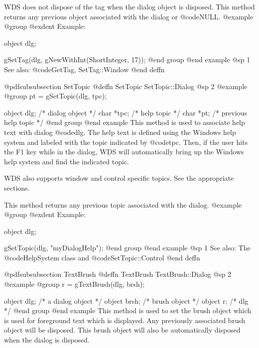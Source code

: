 WDS does not dispose of the tag when the dialog object is disposed.
This method returns any previous object associated with the dialog or
@code{NULL}.
@example
@group
@exdent Example:

object  dlg;

gSetTag(dlg, gNewWithInt(ShortInteger, 17));
@end group
@end example
@sp 1
See also:  @code{GetTag, SetTag::Window}
@end deffn











@pdfsubsubsection {SetTopic}
@deffn {SetTopic} SetTopic::Dialog
@sp 2
@example
@group
pt = gSetTopic(dlg, tpc);

object  dlg;    /*  dialog object         */
char    *tpc;   /*  help topic            */
char    *pt;    /*  previous help topic   */
@end group
@end example
This method is used to associate help text with dialog @code{dlg}.
The help text is defined using the Windows help system and labeled
with the topic indicated by @code{tpc}.  Then, if the user hits
the F1 key while in the dialog, WDS will automatically bring up
the Windows help system and find the indicated topic.

WDS also supports window and control specific topics.  See the appropriate
sections.

This method returns any previous topic associated with the dialog.
@example
@group
@exdent Example:

object  dlg;

gSetTopic(dlg, "myDialogHelp");
@end group
@end example
@sp 1
See also:  The @code{HelpSystem} class and @code{SetTopic::Control} 
@end deffn















@pdfsubsubsection {TextBrush}
@deffn {TextBrush} TextBrush::Dialog
@sp 2
@example
@group
r = gTextBrush(dlg, brsh);

object  dlg;    /*  a dialog object   */
object  brsh;   /*  brush object      */
object  r;      /*  dlg               */
@end group
@end example
This method is used to set the brush object which is used for foreground
text which is displayed.  Any previously associated brush object will
be disposed.  This brush object will also be automatically disposed when the
dialog is disposed.

